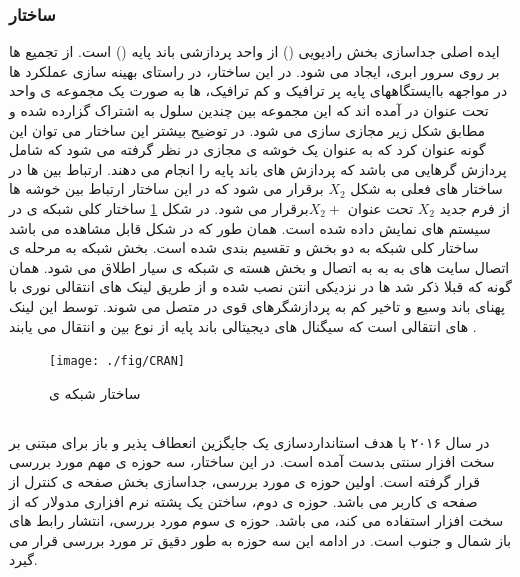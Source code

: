 \subsubsection{ساختار }




ایده اصلی  جداسازی بخش رادیویی () 
 از واحد پردازشی باند پایه ()
  است.
از تجمیع  ها بر روی سرور ابری،  ایجاد می شود.
در این ساختار، در راستای بهینه سازی عملکرد 
 ها در مواجهه باایستگاههای پایه پر ترافیک و کم ترافیک،
 ها به صورت یک مجموعه ی واحد تحت عنوان 
 در آمده اند که این مجموعه بین چندین سلول 
 به اشتراک گزارده شده و مطابق شکل زیر مجازی سازی
می شود. 
در توضیح بیشتر این ساختار می توان این گونه
عنوان کرد که  به عنوان یک خوشه ی مجازی
در نظر گرفته می شود که شامل پردازش گرهایی می باشد
که پردازش های باند پایه را انجام می دهند. ارتباط بین
  ها در ساختار های فعلی به شکل  $X_2$ برقرار می شود
که در این ساختار ارتباط بین خوشه ها از فرم جدید $X_2$
تحت عنوان  $X_2 +$برقرار می شود.
\newline
در شکل \ref{fig:C-RAN} ساختار کلی شبکه ی   در سیستم های
 نمایش داده شده است. همان طور که در شکل قابل
مشاهده می باشد ساختار کلی شبکه   به دو بخش
  و  تقسیم بندی شده است. بخش
 شبکه به مرحله ی اتصال سایت های به
 به  به اتصال  و بخش 
هسته ی شبکه ی سیار اطلاق می شود. همان گونه که قبلا
ذکر شد  ها در نزدیکی انتن نصب شده و از طریق
لینک های انتقالی نوری با پهنای باند وسیع و تاخیر کم به
پردازشگرهای قوی در  متصل می شوند. توسط این
لینک های انتقالی است که سیگنال های دیجیتالی باند
پایه از نوع  بین  و  انتقال می یابند \cite{checko2015cloud}.
\begin{figure}[H]
  \centering
    \texttt{[image: ./fig/CRAN]}
  \caption{ساختار شبکه ی  \cite{checko2015cloud}}
  \label{fig:C-RAN}
\end{figure}
\subsection{}
در سال ۲۰۱۶ با هدف استانداردسازی یک جایگزین انعطاف پذیر و باز برای 
مبتنی بر سخت افزار سنتی بدست آمده است.
 در این ساختار، سه حوزه ی مهم مورد بررسی قرار گرفته است.
اولین حوزه ی مورد بررسی، جداسازی بخش
صفحه ی کنترل
  از 
 صفحه ی کاربر
می باشد. حوزه ی دوم،
ساختن یک پشته نرم افزاری  مدولار که از سخت افزار  استفاده می کند، می باشد.
حوزه ی سوم مورد بررسی، انتشار رابط های باز شمال و جنوب است\cite{xran}.
در ادامه این سه حوزه به طور دقیق تر مورد بررسی قرار می گیرد\cite{xran1}.

